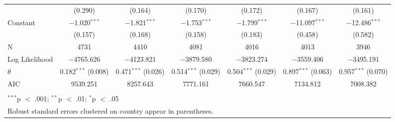 \begin{table}[!htbp]
\begin{tabular}{@{\extracolsep{5pt}}lcccccc}
  & (0.290) & (0.164) & (0.170) & (0.172) & (0.167) & (0.161) \\ 
  Constant & $-$1.020$^{***}$ & $-$1.821$^{***}$ & $-$1.753$^{***}$ & $-$1.799$^{***}$ & $-$11.097$^{***}$ & $-$12.486$^{***}$ \\ 
  & (0.157) & (0.168) & (0.158) & (0.183) & (0.458) & (0.582) \\ 
 N & 4731 & 4410 & 4081 & 4016 & 4013 & 3946 \\ 
Log Likelihood & $-$4765.626 & $-$4123.821 & $-$3879.580 & $-$3823.274 & $-$3559.406 & $-$3495.191 \\ 
$\theta$ & 0.182$^{***}$  (0.008) & 0.471$^{***}$  (0.026) & 0.514$^{***}$  (0.029) & 0.504$^{***}$  (0.029) & 0.897$^{***}$  (0.063) & 0.957$^{***}$  (0.070) \\ 
AIC & 9539.251 & 8257.643 & 7771.161 & 7660.547 & 7134.812 & 7008.382 \\ 
\hline \\[-1.8ex] 
\multicolumn{7}{l}{$^{***}$p $<$ .001; $^{**}$p $<$ .01; $^{*}$p $<$ .05} \\ 
\multicolumn{7}{l}{Robust standard errors clustered on country appear in parentheses.} \\ 
\end{tabular} 
\end{table} 
